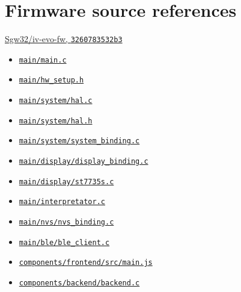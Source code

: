 \section{Firmware source references}
\href{https://github.com/Sgw32/iv-evo-fw/tree/3260783532b3d4ad8529b23f4e907c0a6ab03262}{Sgw32/iv-evo-fw, \texttt{3260783532b3}}
\begin{itemize}
\item \href{https://github.com/Sgw32/iv-evo-fw/blob/3260783532b3d4ad8529b23f4e907c0a6ab03262/main/main.c}{\nolinkurl{main/main.c}}
\item \href{https://github.com/Sgw32/iv-evo-fw/blob/3260783532b3d4ad8529b23f4e907c0a6ab03262/main/hw_setup.h}{\nolinkurl{main/hw_setup.h}}
\item \href{https://github.com/Sgw32/iv-evo-fw/blob/3260783532b3d4ad8529b23f4e907c0a6ab03262/main/system/hal.c}{\nolinkurl{main/system/hal.c}}
\item \href{https://github.com/Sgw32/iv-evo-fw/blob/3260783532b3d4ad8529b23f4e907c0a6ab03262/main/system/hal.h}{\nolinkurl{main/system/hal.h}}
\item \href{https://github.com/Sgw32/iv-evo-fw/blob/3260783532b3d4ad8529b23f4e907c0a6ab03262/main/system/system_binding.c}{\nolinkurl{main/system/system_binding.c}}
\item \href{https://github.com/Sgw32/iv-evo-fw/blob/3260783532b3d4ad8529b23f4e907c0a6ab03262/main/display/display_binding.c}{\nolinkurl{main/display/display_binding.c}}
\item \href{https://github.com/Sgw32/iv-evo-fw/blob/3260783532b3d4ad8529b23f4e907c0a6ab03262/main/display/st7735s.c}{\nolinkurl{main/display/st7735s.c}}
\item \href{https://github.com/Sgw32/iv-evo-fw/blob/3260783532b3d4ad8529b23f4e907c0a6ab03262/main/interpretator.c}{\nolinkurl{main/interpretator.c}}
\item \href{https://github.com/Sgw32/iv-evo-fw/blob/3260783532b3d4ad8529b23f4e907c0a6ab03262/main/nvs/nvs_binding.c}{\nolinkurl{main/nvs/nvs_binding.c}}
\item \href{https://github.com/Sgw32/iv-evo-fw/blob/3260783532b3d4ad8529b23f4e907c0a6ab03262/main/ble/ble_client.c}{\nolinkurl{main/ble/ble_client.c}}
\item \href{https://github.com/Sgw32/iv-evo-fw/blob/3260783532b3d4ad8529b23f4e907c0a6ab03262/components/frontend/src/main.js}{\nolinkurl{components/frontend/src/main.js}}
\item \href{https://github.com/Sgw32/iv-evo-fw/blob/3260783532b3d4ad8529b23f4e907c0a6ab03262/components/backend/backend.c}{\nolinkurl{components/backend/backend.c}}

\end{itemize}

